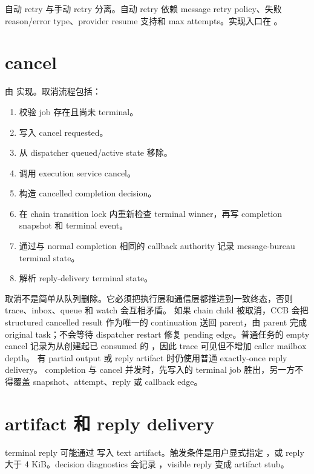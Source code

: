 自动 retry 与手动 retry 分离。自动 retry 依赖 message retry policy、失败 reason/error type、provider resume 支持和 max attempts。实现入口在 。

\section{cancel}

 由  实现。取消流程包括：

\begin{enumerate}
  \item 校验 job 存在且尚未 terminal。
  \item 写入 cancel requested。
  \item 从 dispatcher queued/active state 移除。
  \item 调用 execution service cancel。
  \item 构造 cancelled completion decision。
  \item 在 chain transition lock 内重新检查 terminal winner，再写 completion
        snapshot 和 terminal event。
  \item 通过与 normal completion 相同的 callback authority 记录
        message-bureau terminal state。
  \item 解析 reply-delivery terminal state。
\end{enumerate}

取消不是简单从队列删除。它必须把执行层和通信层都推进到一致终态，否则 trace、inbox、queue 和 watch 会互相矛盾。
如果 chain child 被取消，CCB 会把 structured cancelled result 作为唯一的
continuation 送回 parent，由 parent 完成 original task；不会等待 dispatcher
restart 修复 pending edge。普通任务的 empty cancel 记录为从创建起已 consumed
的 ，因此 trace 可见但不增加 caller mailbox depth。
有 partial output 或 reply artifact 时仍使用普通 exactly-once reply delivery。
completion 与 cancel 并发时，先写入的 terminal job 胜出，另一方不得覆盖
snapshot、attempt、reply 或 callback edge。

\section{artifact 和 reply delivery}

terminal reply 可能通过  写入 text artifact。触发条件是用户显式指定 ，或 reply 大于 4 KiB。decision diagnostics 会记录 ，visible reply 变成 artifact stub。

